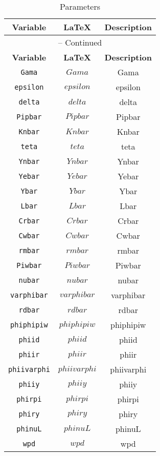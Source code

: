 \begin{center}
\begin{longtable}{ccc}
\caption{Parameters}\\%
\hline%
\multicolumn{1}{c}{\textbf{Variable}} &
\multicolumn{1}{c}{\textbf{\LaTeX}} &
\multicolumn{1}{c}{\textbf{Description}}\\%
\hline\hline%
\endfirsthead
\multicolumn{3}{c}{{\tablename} \thetable{} -- Continued}\\%
\hline%
\multicolumn{1}{c}{\textbf{Variable}} &
\multicolumn{1}{c}{\textbf{\LaTeX}} &
\multicolumn{1}{c}{\textbf{Description}}\\%
\hline\hline%
\endhead
\texttt{Gama} & $Gama$ & Gama\\
\texttt{epsilon} & $epsilon$ & epsilon\\
\texttt{delta} & $delta$ & delta\\
\texttt{Pipbar} & $Pipbar$ & Pipbar\\
\texttt{Knbar} & $Knbar$ & Knbar\\
\texttt{teta} & $teta$ & teta\\
\texttt{Ynbar} & $Ynbar$ & Ynbar\\
\texttt{Yebar} & $Yebar$ & Yebar\\
\texttt{Ybar} & $Ybar$ & Ybar\\
\texttt{Lbar} & $Lbar$ & Lbar\\
\texttt{Crbar} & $Crbar$ & Crbar\\
\texttt{Cwbar} & $Cwbar$ & Cwbar\\
\texttt{rmbar} & $rmbar$ & rmbar\\
\texttt{Piwbar} & $Piwbar$ & Piwbar\\
\texttt{nubar} & $nubar$ & nubar\\
\texttt{varphibar} & $varphibar$ & varphibar\\
\texttt{rdbar} & $rdbar$ & rdbar\\
\texttt{phiphipiw} & $phiphipiw$ & phiphipiw\\
\texttt{phiid} & $phiid$ & phiid\\
\texttt{phiir} & $phiir$ & phiir\\
\texttt{phiivarphi} & $phiivarphi$ & phiivarphi\\
\texttt{phiiy} & $phiiy$ & phiiy\\
\texttt{phirpi} & $phirpi$ & phirpi\\
\texttt{phiry} & $phiry$ & phiry\\
\texttt{phinuL} & $phinuL$ & phinuL\\
\texttt{wpd} & $wpd$ & wpd\\

\end{longtable}
\end{center}
